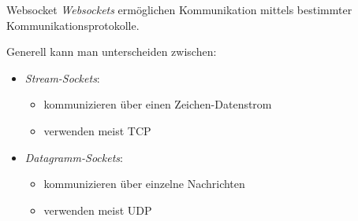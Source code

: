 \begin{defi}{Websocket}
    \emph{Websockets} ermöglichen Kommunikation mittels bestimmter Kommunikationsprotokolle.

    Generell kann man unterscheiden zwischen:
    \begin{itemize}
        \item \emph{Stream-Sockets}:
              \begin{itemize}
                  \item kommunizieren über einen Zeichen-Datenstrom
                  \item verwenden meist TCP
              \end{itemize}
        \item \emph{Datagramm-Sockets}:
              \begin{itemize}
                  \item kommunizieren über einzelne Nachrichten
                  \item verwenden meist UDP
              \end{itemize}
    \end{itemize}
\end{defi}

